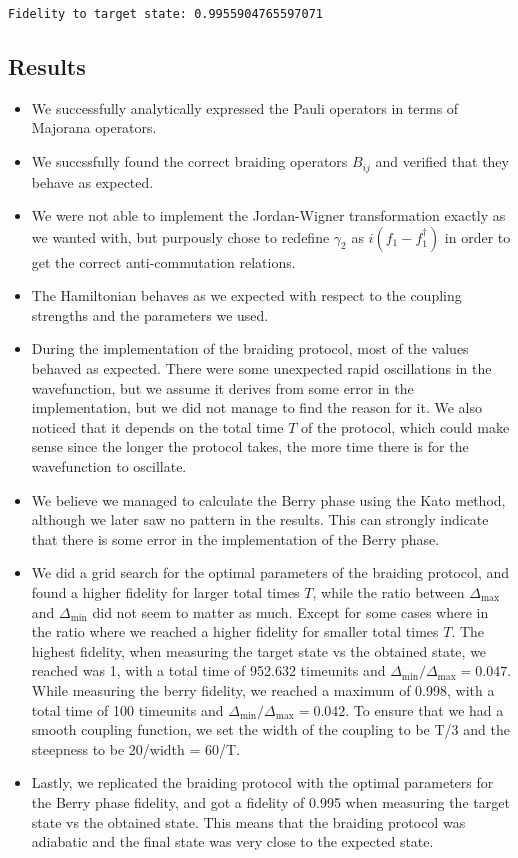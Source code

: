 \documentclass[11pt,landscape]{article}
\providecommand{\tightlist}{%
      \setlength{\itemsep}{0pt}\setlength{\parskip}{0pt}}
\begin{document}
    \begin{Verbatim}[commandchars=\\\{\}]
Fidelity to target state: 0.9955904765597071
    \end{Verbatim}

    \subsection{Results}\label{results}

\begin{itemize}
\tightlist
\item
  We successfully analytically expressed the Pauli operators in terms of
  Majorana operators.
\item
  We succssfully found the correct braiding operators \(B_{ij}\) and
  verified that they behave as expected.
\item
  We were not able to implement the Jordan-Wigner transformation exactly
  as we wanted with, but purpously chose to redefine \(γ_2\) as
  \(i(f_1 - f_1^{†})\) in order to get the correct anti-commutation
  relations.
\item
  The Hamiltonian behaves as we expected with respect to the coupling
  strengths and the parameters we used.
\item
  During the implementation of the braiding protocol, most of the values
  behaved as expected. There were some unexpected rapid oscillations in
  the wavefunction, but we assume it derives from some error in the
  implementation, but we did not manage to find the reason for it. We
  also noticed that it depends on the total time \(T\) of the protocol,
  which could make sense since the longer the protocol takes, the more
  time there is for the wavefunction to oscillate.
\item
  We believe we managed to calculate the Berry phase using the Kato
  method, although we later saw no pattern in the results. This can
  strongly indicate that there is some error in the implementation of
  the Berry phase.
\item
  We did a grid search for the optimal parameters of the braiding
  protocol, and found a higher fidelity for larger total times \(T\),
  while the ratio between \(Δ_{\max}\) and \(Δ_{\min}\) did not seem to
  matter as much. Except for some cases where in the ratio where we
  reached a higher fidelity for smaller total times \(T\). The highest
  fidelity, when measuring the target state vs the obtained state, we
  reached was 1, with a total time of 952.632 timeunits and
  \(Δ_{\min}/Δ_{\max}=0.047\). While measuring the berry fidelity, we
  reached a maximum of 0.998, with a total time of 100 timeunits and
  \(Δ_{\min}/Δ_{\max}=0.042\). To ensure that we had a smooth coupling
  function, we set the width of the coupling to be T/3 and the steepness
  to be 20/width = 60/T.
\item
  Lastly, we replicated the braiding protocol with the optimal
  parameters for the Berry phase fidelity, and got a fidelity of 0.995
  when measuring the target state vs the obtained state. This means that
  the braiding protocol was adiabatic and the final state was very close
  to the expected state.
\end{itemize}
\end{document}
